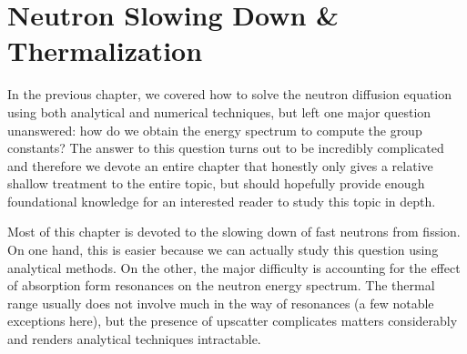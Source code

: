 \chapter{Neutron Slowing Down \& Thermalization}

In the previous chapter, we covered how to solve the neutron diffusion equation using both analytical and numerical techniques, but left one major question unanswered: how do we obtain the energy spectrum to compute the group constants? The answer to this question turns out to be incredibly complicated and therefore we devote an entire chapter that honestly only gives a relative shallow treatment to the entire topic, but should hopefully provide enough foundational knowledge for an interested reader to study this topic in depth. 

Most of this chapter is devoted to the slowing down of fast neutrons from fission. On one hand, this is easier because we can actually study this question using analytical methods. On the other, the major difficulty is accounting for the effect of absorption form resonances on the neutron energy spectrum. The thermal range usually does not involve much in the way of resonances (a few notable exceptions here), but the presence of upscatter complicates matters considerably and renders analytical techniques intractable.

